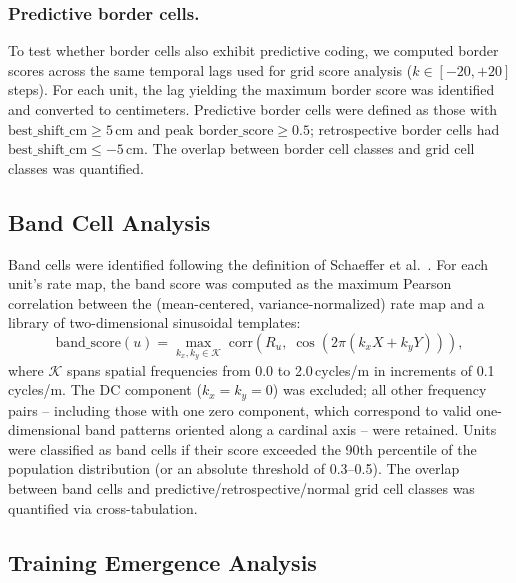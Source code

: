 \documentclass[11pt]{article}
\begin{document}
\subsubsection*{Predictive border cells.}
To test whether border cells also exhibit predictive coding, we computed border scores across the same temporal lags used for grid score analysis ($k \in [-20, +20]$ steps). For each unit, the lag yielding the maximum border score was identified and converted to centimeters. Predictive border cells were defined as those with $\mathrm{best\_shift\_cm} \ge 5$\,cm and peak $\mathrm{border\_score} \ge 0.5$; retrospective border cells had $\mathrm{best\_shift\_cm} \le -5$\,cm. The overlap between border cell classes and grid cell classes was quantified.


\subsection*{Band Cell Analysis}

Band cells were identified following the definition of Schaeffer et al.\ \cite{schaeffer2024}. For each unit's rate map, the band score was computed as the maximum Pearson correlation between the (mean-centered, variance-normalized) rate map and a library of two-dimensional sinusoidal templates:
\begin{equation}
    \mathrm{band\_score}(u) = \max_{k_x, k_y \in \mathcal{K}}\;\mathrm{corr}\!\left(R_u,\;\cos\!\left(2\pi(k_x X + k_y Y)\right)\right),
\end{equation}
where $\mathcal{K}$ spans spatial frequencies from 0.0 to 2.0\,cycles/m in increments of 0.1 cycles/m. The DC component ($k_x = k_y = 0$) was excluded; all other frequency pairs -- including those with one zero component, which correspond to valid one-dimensional band patterns oriented along a cardinal axis -- were retained. Units were classified as band cells if their score exceeded the 90th percentile of the population distribution (or an absolute threshold of 0.3--0.5). The overlap between band cells and predictive/retrospective/normal grid cell classes was quantified via cross-tabulation.


\subsection*{Training Emergence Analysis}
\end{document}
